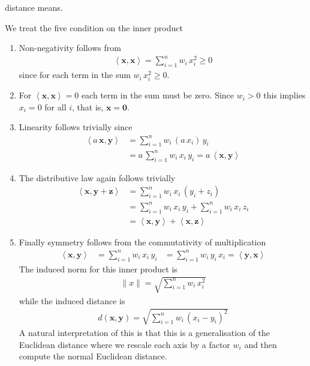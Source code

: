 \documentclass{sotonExamBoxes}    %
\newcommand{\len}[1]{\| #1 \|}
\newcommand{\inner}[2]{\left\langle #1, #2\right\rangle}
\begin{document}
\begin{question}{20}
\begin{qparts}
{      distance means.}{}
    \begin{answer}
      We treat the five condition on the inner product
      \begin{enumerate}
      \item Non-negativity follows from
        \begin{align*}
          \inner{\bm{x}}{\bm{x}} = \sum_{i=1}^n w_i \, x_i ^2
          \geq 0
        \end{align*}
        since for each term in the sum $w_i \, x_i ^2\geq0$.
      \item For $ \inner{\bm{x}}{\bm{x}} = 0$ each term in the sum
        must be zero.  Since $w_i>0$ this implies $x_i=0$ for all $i$,
        that is, $\bm{x}=\bm{0}$.
      \item Linearity follows trivially since
        \begin{align*}
          \inner{a\,\bm{x}}{\bm{y}}
          &= \sum_{i=1}^n w_i \, (a\,x_i)  \,y_i \\
          &= a\, \sum_{i=1}^n w_i \, x_i \,y_i = a\,\inner{\bm{x}}{\bm{y}}
        \end{align*}
      \item The distributive law again follows trivially
        \begin{align*}
          \inner{\bm{x}}{\bm{y}+\bm{z}}
          &= \sum_{i=1}^n w_i \, x_i \,(y_i+z_i) \\
          &= \sum_{i=1}^n w_i \, x_i \,y_i + \sum_{i=1}^n w_i \, x_i \,z_i 
          \\
          &=   \inner{\bm{x}}{\bm{y}} +   \inner{\bm{x}}{\bm{z}}
        \end{align*}
      \item Finally symmetry follows from the commutativity of
        multiplication
        \begin{align*}
          \inner{\bm{x}}{\bm{y}} &=  \sum_{i=1}^n w_i \, x_i \,y_i
          &=  \sum_{i=1}^n w_i \, y_i \,x_i =  \inner{\bm{y}}{\bm{x}} 
        \end{align*}
        The induced norm for this inner product is
        \begin{align*}
          \len{x} = \sqrt{\sum_{i=1}^n w_i \, x_i^2}
        \end{align*}
        while the induced distance is
        \begin{align*}
          d(\bm{x}, \bm{y}) = \sqrt{ \sum_{i=1}^n w_i \, (x_i-y_i)^2}
        \end{align*}
        A natural interpretation of this is that this is a
        generalisation of the Euclidean distance where we rescale each
        axis by a factor $w_i$ and then compute the normal Euclidean distance.
      \end{enumerate}
    \end{answer}
  \end{qparts}
  
\end{question}




\end{document}
